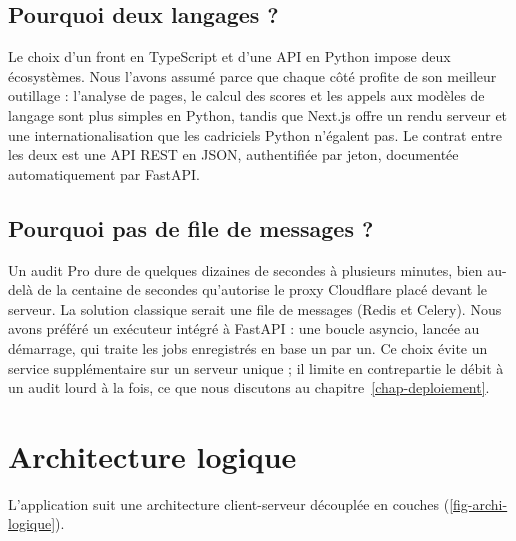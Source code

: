 \subsection{Pourquoi deux langages ?}
Le choix d'un front en TypeScript et d'une API en Python impose deux écosystèmes. Nous l'avons assumé parce que chaque côté profite de son meilleur outillage : l'analyse de pages, le calcul des scores et les appels aux modèles de langage sont plus simples en Python, tandis que Next.js offre un rendu serveur et une internationalisation que les cadriciels Python n'égalent pas. Le contrat entre les deux est une API REST en JSON, authentifiée par jeton, documentée automatiquement par FastAPI.

\subsection{Pourquoi pas de file de messages ?}
Un audit Pro dure de quelques dizaines de secondes à plusieurs minutes, bien au-delà de la centaine de secondes qu'autorise le proxy Cloudflare placé devant le serveur. La solution classique serait une file de messages (Redis et Celery). Nous avons préféré un exécuteur intégré à FastAPI : une boucle asyncio, lancée au démarrage, qui traite les jobs enregistrés en base un par un. Ce choix évite un service supplémentaire sur un serveur unique ; il limite en contrepartie le débit à un audit lourd à la fois, ce que nous discutons au chapitre~\ref{chap-deploiement}.

\section{Architecture logique}
L'application suit une architecture client-serveur découplée en couches (\cref{fig-archi-logique}).

